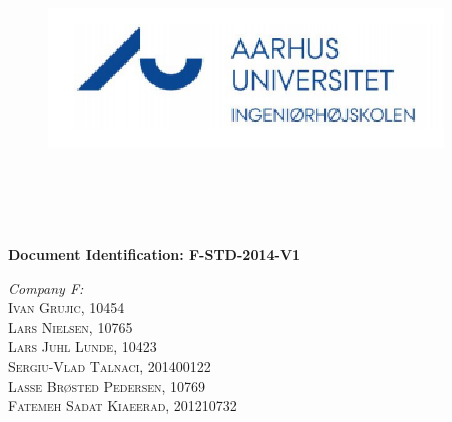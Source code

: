 \begin{titlepage}
\begin{center}



\begin{figure}
\includegraphics[scale=0.5]{./images/logo.png}\\
\\   
\\
\end{figure}
\\[0.5cm]
\\[2cm]

{ \bfseries Document Identification: F-STD-2014-V1}\\[2cm]



\begin{flushleft} \large
\emph{Company F:}\\
\textsc{Ivan Grujic, 10454\\}
\textsc{Lars Nielsen, 10765\\}
\textsc{Lars Juhl Lunde, 10423\\}
\textsc{Sergiu-Vlad Talnaci, 201400122\\}
\textsc{Lasse Br\o sted Pedersen, 10769\\}
\textsc{Fatemeh Sadat Kiaeerad, 201210732}\\[2cm]
 \\ 
\\
\end{flushleft}





\end{center}
\end{titlepage}
